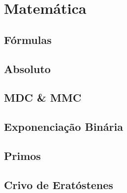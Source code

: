 % 

% 


\section{Matemática}

\subsection{Fórmulas}


\subsection{Absoluto}


\subsection{MDC \& MMC}


\subsection{Exponenciação Binária}


% 

\subsection{Primos}


\subsection{Crivo de Eratóstenes}


